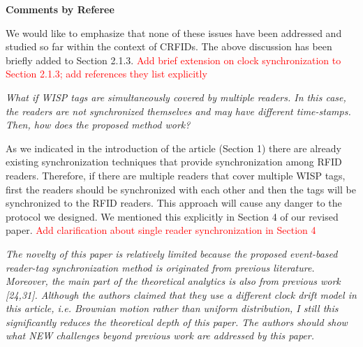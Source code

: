 \documentclass[10pt]{article}
\newcommand{\referee}[1]{
	{\item \color{OliveGreen} \emph{{#1}}}
	\label{R\therefereeCounter:\arabic{enumi}}
}
\newcommand{\response}[1]{{\color{blue} #1}}
\newcounter{refereeCounter}
\newenvironment{responses}{%
\refstepcounter{refereeCounter}%
\textbf{\large Comments by Referee \therefereeCounter}
\begin{enumerate}%
\renewcommand{\labelenumi}{\textbf{[R\therefereeCounter :\,\arabic{enumi}]}} %
}{\end{enumerate}}
\begin{document}
\begin{responses}
{We would like to emphasize that none of these issues have been addressed and studied so far within the context of CRFIDs. The above discussion has been briefly added to Section 2.1.3. \textcolor{red}{Add brief extension on clock synchronization to Section 2.1.3; add references they list explicitly}
}

\referee{What if WISP tags are simultaneously covered by multiple readers. In this case, the readers are not synchronized themselves and may have different time-stamps. Then, how does the proposed method work?}

\response{
As we indicated in the introduction of the article (Section 1) there are already existing synchronization techniques that provide synchronization among RFID readers. Therefore, if there are multiple readers that cover multiple WISP tags, first the readers should be synchronized with each other and then the tags will be synchronized to the RFID readers. This approach will cause any danger to the protocol we designed. We mentioned this explicitly in Section 4 of our revised paper. \textcolor{red}{Add clarification about single reader synchronization in Section 4}
}
	
\referee{The novelty of this paper is relatively limited because the proposed event-based reader-tag synchronization method is originated from previous literature. Moreover, the main part of the theoretical analytics is also from previous work [24,31]. Although the authors claimed that they use a different clock drift model in this article, i.e. Brownian motion rather than uniform distribution, I still this significantly reduces the theoretical depth of this paper. The authors should show what NEW challenges beyond previous work are addressed by this paper. }


\end{responses}
\end{document}
